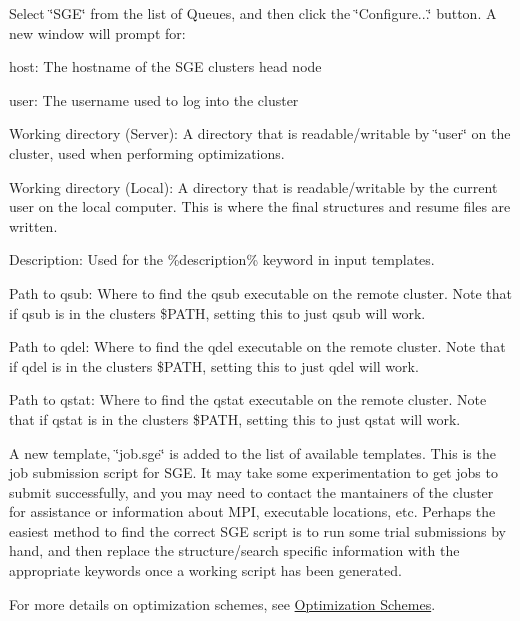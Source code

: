 Select \char`\"{}\+S\+G\+E\char`\"{} from the list of Queues, and then click the \char`\"{}\+Configure...\char`\"{} button. A new window will prompt for\+:
\begin{DoxyItemize}
\item host\+: The hostname of the S\+G\+E cluster\textquotesingle{}s head node
\item user\+: The username used to log into the cluster
\item Working directory (Server)\+: A directory that is readable/writable by \char`\"{}user\char`\"{} on the cluster, used when performing optimizations.
\item Working directory (Local)\+: A directory that is readable/writable by the current user on the local computer. This is where the final structures and resume files are written.
\item Description\+: Used for the \%description\% keyword in input templates.
\item Path to qsub\+: Where to find the qsub executable on the remote cluster. Note that if qsub is in the cluster\textquotesingle{}s \$\+P\+A\+T\+H, setting this to just \textquotesingle{}qsub\textquotesingle{} will work.
\item Path to qdel\+: Where to find the qdel executable on the remote cluster. Note that if qdel is in the cluster\textquotesingle{}s \$\+P\+A\+T\+H, setting this to just \textquotesingle{}qdel\textquotesingle{} will work.
\item Path to qstat\+: Where to find the qstat executable on the remote cluster. Note that if qstat is in the cluster\textquotesingle{}s \$\+P\+A\+T\+H, setting this to just \textquotesingle{}qstat\textquotesingle{} will work.
\end{DoxyItemize}

A new template, \char`\"{}job.\+sge\char`\"{} is added to the list of available templates. This is the job submission script for S\+G\+E. It may take some experimentation to get jobs to submit successfully, and you may need to contact the mantainers of the cluster for assistance or information about M\+P\+I, executable locations, etc. Perhaps the easiest method to find the correct S\+G\+E script is to run some trial submissions by hand, and then replace the structure/search specific information with the appropriate keywords once a working script has been generated.

For more details on optimization schemes, see \hyperlink{optschemes}{Optimization Schemes}.

